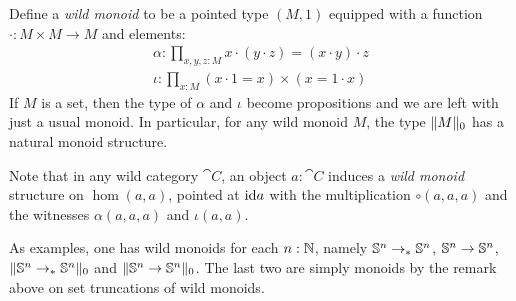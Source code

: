 \documentclass[english,a4]{article}
\newcommand{\ptdto}{\to_\ast}%
\newcommand{\setTrunc}[1]{\Trunc{#1}_0}
\begin{document}
\begin{remark}
  Define a \emph{wild monoid} to be a pointed type $(M,1)$ equipped with a
  function $\cdot : M \times M \to M$ and elements:
  \begin{gather*}
    \alpha: \prod_{x,y,z:M}x\cdot(y\cdot z) = (x\cdot y) \cdot z \\
    \iota: \prod_{x:M} (x\cdot 1 = x) \times (x = 1 \cdot x)
  \end{gather*}
  If $M$ is a set, then the type of $\alpha$ and $\iota$ become propositions
  and we are left with just a usual monoid. In particular, for any wild monoid
  $M$, the type $\setTrunc M$ has a natural monoid structure.

  Note that in any wild category $\cat C$, an object $a:\cat C$ induces a
  \emph{wild monoid} structure on $\hom(a,a)$, pointed at $\mathord{\mathrm{id}} a$ with the
  multiplication $\circ(a,a,a)$ and the witnesses $\alpha(a,a,a)$ and
  $\iota(a,a)$. 

  As examples, one has wild monoids for each $n:\mathbb{N}$, namely $\Sn n \ptdto \Sn
  n$, ${\mathbb S^{n}} \to {\mathbb S^{n}}$, $\setTrunc{\Sn n \ptdto \Sn n}$ and $\setTrunc{\Sn n
  \to \Sn n}$. The last two are simply monoids by the remark above on set
  truncations of wild monoids.
  \label{rem:wild-monoids}
\end{remark}

\printbibliography
\end{document}
